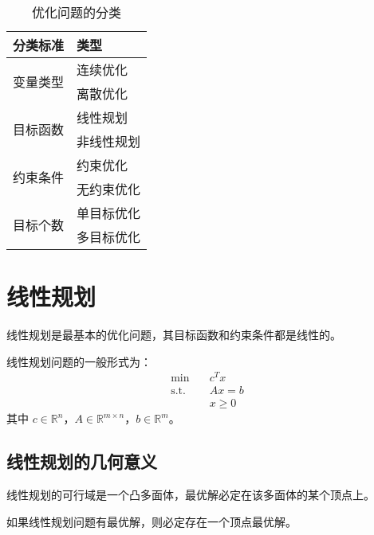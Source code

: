 \begin{table}[htbp]
    \centering
    \caption{优化问题的分类}
    \label{tab:optimization-types}
    \begin{tabular}{@{}ll@{}}
        \toprule
        分类标准 & 类型 \\
        \midrule
        \multirow{2}{*}{变量类型} & 连续优化 \\
        & 离散优化 \\
        \midrule
        \multirow{2}{*}{目标函数} & 线性规划 \\
        & 非线性规划 \\
        \midrule
        \multirow{2}{*}{约束条件} & 约束优化 \\
        & 无约束优化 \\
        \midrule
        \multirow{2}{*}{目标个数} & 单目标优化 \\
        & 多目标优化 \\
        \bottomrule
    \end{tabular}
\end{table}

\section{线性规划}\label{sec:linear-programming}

线性规划是最基本的优化问题，其目标函数和约束条件都是线性的。

\begin{definition}[线性规划]\label{def:linear-programming}
线性规划问题的一般形式为：
\begin{align}
\min \quad & c^T x \\
\text{s.t.} \quad & Ax = b \\
& x \geq 0
\end{align}
其中 $c \in \mathbb{R}^n$，$A \in \mathbb{R}^{m \times n}$，$b \in \mathbb{R}^m$。
\end{definition}

\subsection{线性规划的几何意义}

线性规划的可行域是一个凸多面体，最优解必定在该多面体的某个顶点上。

\begin{theorem}[线性规划基本定理]\label{thm:lp-fundamental}
如果线性规划问题有最优解，则必定存在一个顶点最优解。
\end{theorem}

